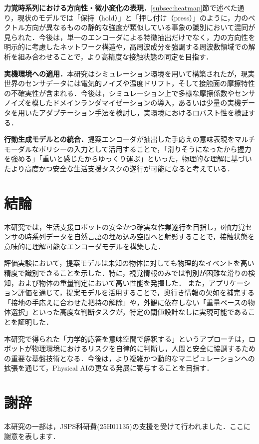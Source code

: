\documentclass[Japanese]{dicomopapers}
\begin{document}
\textbf{力覚時系列における方向性・微小変化の表現．}\ref{subsec:heatmap}節で述べた通り，現状のモデルでは「保持（hold）」と「押し付け（press）」のように，力のベクトル方向が異なるものの静的な強度が類似している事象の識別において混同が見られた．今後は，単一のエンコーダによる特徴抽出だけでなく，力の方向性を明示的に考慮したネットワーク構造や，高周波成分を強調する周波数領域での解析を組み合わせることで，より高精度な接触状態の同定を目指す．

\textbf{実機環境への適用．}本研究はシミュレーション環境を用いて構築されたが，現実世界のセンサデータには電気的ノイズや温度ドリフト，そして接触面の摩擦特性の不確実性が含まれる．今後は，シミュレーション上で多様な摩擦係数やセンサノイズを模したドメインランダマイゼーションの導入，あるいは少量の実機データを用いたアダプテーション手法を検討し，実環境におけるロバスト性を検証する．

\textbf{行動生成モデルとの統合．}提案エンコーダが抽出した手応えの意味表現をマルチモーダルなポリシーの入力として活用することで，「滑りそうになったから握力を強める」「重いと感じたからゆっくり運ぶ」といった，物理的な理解に基づいたより高度かつ安全な生活支援タスクの遂行が可能になると考えている．

\section{結論}
本研究では，生活支援ロボットの安全かつ確実な作業遂行を目指し，6軸力覚センサの時系列データを自然言語の埋め込み空間へと射影することで，接触状態を意味的に理解可能なエンコーダモデルを構築した．

評価実験において，提案モデルは未知の物体に対しても物理的なイベントを高い精度で識別できることを示した．特に，視覚情報のみでは判別が困難な滑りの検知，および物体の重量判定において高い性能を発揮した．
また，アプリケーション評価を通じて，提案モデルを活用することで，奥行き情報の欠如を補完する「接地の手応えに合わせた把持の解除」や，外観に依存しない「重量ベースの物体選択」といった高度な判断タスクが，特定の閾値設計なしに実現可能であることを証明した．

本研究で得られた「力学的応答を意味空間で解釈する」というアプローチは，ロボットが物理環境におけるリスクを自律的に判断し，人間と安全に協調するための重要な基盤技術となる．今後は，より複雑かつ動的なマニピュレーションへの拡張を通じて，Physical AIの更なる発展に寄与することを目指す．

\section*{謝辞}
本研究の一部は，JSPS科研費(25H01135)の支援を受けて行われました．ここに謝意を表します．



\end{document}
